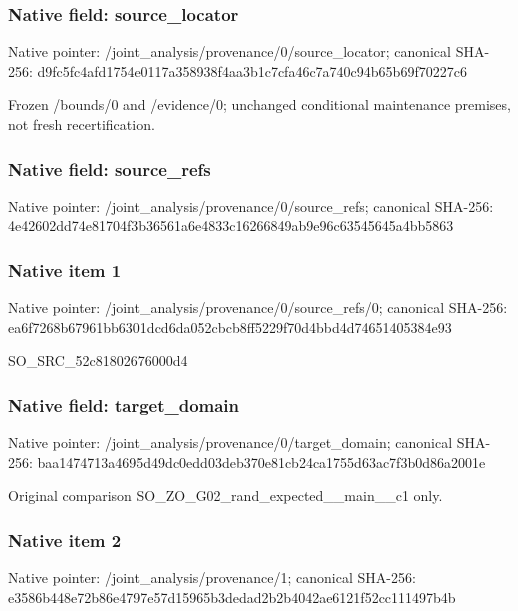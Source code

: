 \documentclass[10pt,a4paper]{article}
\begin{document}
\subsubsection{Native field: source\_\allowbreak{}locator}
Native pointer: /joint\_\allowbreak{}analysis/provenance/0/source\_\allowbreak{}locator; canonical SHA-256: d9fc5fc4afd1754e0117a358938f4aa3b1c7cfa46c7a740c94b65b69f70227c6

\begingroup\raggedright\sloppy Frozen /\allowbreak{}bounds/\allowbreak{}0 and /\allowbreak{}evidence/\allowbreak{}0;\allowbreak{} unchanged conditional maintenance premises,\allowbreak{} not fresh recertification.\par\endgroup

\subsubsection{Native field: source\_\allowbreak{}refs}
Native pointer: /joint\_\allowbreak{}analysis/provenance/0/source\_\allowbreak{}refs; canonical SHA-256: 4e42602dd74e81704f3b36561a6e4833c16266849ab9e96c63545645a4bb5863

\subsubsection{Native item 1}
Native pointer: /joint\_\allowbreak{}analysis/provenance/0/source\_\allowbreak{}refs/0; canonical SHA-256: ea6f7268b67961bb6301dcd6da052cbcb8ff5229f70d4bbd4d74651405384e93

\begingroup\raggedright\sloppy SO\_\allowbreak{}SRC\_\allowbreak{}52c81802676000d4\par\endgroup

\subsubsection{Native field: target\_\allowbreak{}domain}
Native pointer: /joint\_\allowbreak{}analysis/provenance/0/target\_\allowbreak{}domain; canonical SHA-256: baa1474713a4695d49dc0edd03deb370e81cb24ca1755d63ac7f3b0d86a2001e

\begingroup\raggedright\sloppy Original comparison SO\_\allowbreak{}ZO\_\allowbreak{}G02\_\allowbreak{}rand\_\allowbreak{}expected\_\allowbreak{}\_\allowbreak{}main\_\allowbreak{}\_\allowbreak{}c1 only.\par\endgroup

\subsubsection{Native item 2}
Native pointer: /joint\_\allowbreak{}analysis/provenance/1; canonical SHA-256: e3586b448e72b86e4797e57d15965b3dedad2b2b4042ae6121f52cc111497b4b
\end{document}
